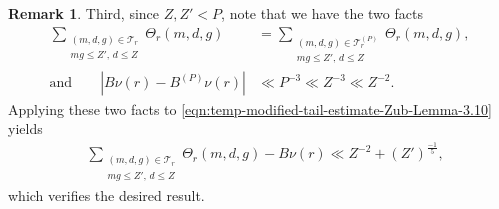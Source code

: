 \documentclass[12pt,letterpaper,reqno]{amsart}
\theoremstyle{plain}
\theoremstyle{definition}
\newtheorem{remark}[theorem]{Remark}
\numberwithin{equation}{section}
\numberwithin{figure}{section}
\numberwithin{table}{section}
\newcommand{\lrabs}[1]{\!\left\lvert #1 \right\lvert}
\begin{document}
\begin{remark}
        Third, since $Z,Z' < P$, note that we have the two facts
        \begin{align}
            \sum_{\substack{(m,d,g) \in \mathcal{T}_r \\
            mg \le Z'\!,\, d \le Z}} \Theta_r(m,d,g) 
            &= \sum_{\substack{(m,d,g) \in \mathcal{T}_r^{(P)} \\
            mg \le Z'\!,\, d \le Z}} \Theta_r(m,d,g), \\
            \text{and} \qquad 
            \lrabs{B \nu(r) - B^{(P)}\nu(r)} &\ll P^{-3} \ll Z^{-3} \ll Z^{-2}.
        \end{align}
        Applying these two facts to \eqref{eqn:temp-modified-tail-estimate-Zub-Lemma-3.10} yields
        \begin{align}
            &\sum_{\substack{(m,d,g) \in \mathcal{T}_r \\
            mg \le Z'\!,\, d \le Z}} \Theta_r(m,d,g)  - B \nu(r) \ll Z^{-2} + (Z')^{\frac{-1}{5}},
        \end{align}
        which verifies the desired result.
\end{remark}
\end{document}
